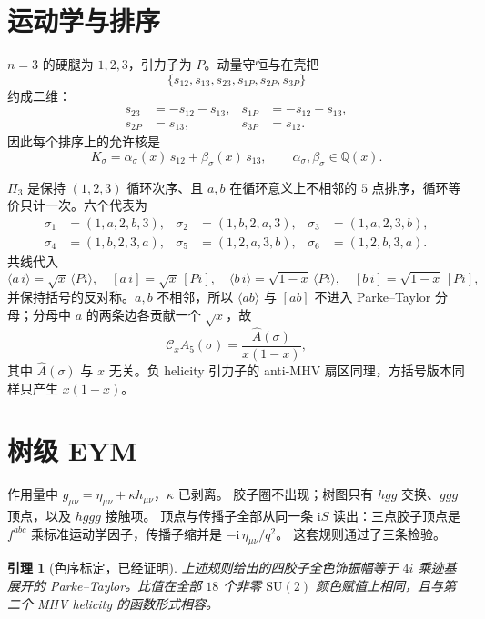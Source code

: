 \documentclass[11pt]{ctexart}
\numberwithin{equation}{section}
\newtheorem{lemma}[theorem]{引理}
\theoremstyle{definition}
\theoremstyle{remark}
\newcommand{\ang}[1]{\langle #1\rangle}
\newcommand{\sq}[1]{[#1]}
\newcommand{\cA}{\mathcal C_x}
\begin{document}
\section{运动学与排序}
$n=3$ 的硬腿为 $1,2,3$，引力子为 $P$。动量守恒与在壳把
\[
\{s_{12},s_{13},s_{23},s_{1P},s_{2P},s_{3P}\}
\]
约成二维：
\begin{equation}
\begin{aligned}
s_{23}&=-s_{12}-s_{13},&
s_{1P}&=-s_{12}-s_{13},\\
s_{2P}&=s_{13},&
s_{3P}&=s_{12}.
\end{aligned}
\label{eq:mandelstam}
\end{equation}
因此每个排序上的允许核是
\[
K_\sigma=\alpha_\sigma(x)\,s_{12}+\beta_\sigma(x)\,s_{13},
\qquad\alpha_\sigma,\beta_\sigma\in\mathbb Q(x).
\]

$\Pi_3$ 是保持 $(1,2,3)$ 循环次序、且 $a,b$ 在循环意义上不相邻的 $5$ 点排序，循环等价只计一次。六个代表为
\begin{align*}
\sigma_1&=(1,a,2,b,3),&
\sigma_2&=(1,b,2,a,3),&
\sigma_3&=(1,a,2,3,b),\\
\sigma_4&=(1,b,2,3,a),&
\sigma_5&=(1,2,a,3,b),&
\sigma_6&=(1,2,b,3,a).
\end{align*}
共线代入
\[
\ang{a\,i}=\sqrt x\,\ang{Pi},\quad
\sq{a\,i}=\sqrt x\,\sq{Pi},\quad
\ang{b\,i}=\sqrt{1-x}\,\ang{Pi},\quad
\sq{b\,i}=\sqrt{1-x}\,\sq{Pi},
\]
并保持括号的反对称。$a,b$ 不相邻，所以 $\ang{ab}$ 与 $\sq{ab}$ 不进入 Parke--Taylor 分母；分母中 $a$ 的两条边各贡献一个 $\sqrt x$，故
\[
\cA A_5(\sigma)=\frac{\widehat A(\sigma)}{x(1-x)},
\]
其中 $\widehat A(\sigma)$ 与 $x$ 无关。负 helicity 引力子的 anti-MHV 扇区同理，方括号版本同样只产生 $x(1-x)$。

\section{树级 EYM}
\label{sec:tree}

作用量中 $g_{\mu\nu}=\eta_{\mu\nu}+\kappa h_{\mu\nu}$，$\kappa$ 已剥离。
胶子圈不出现；树图只有 $hgg$ 交换、$ggg$ 顶点，以及 $hggg$ 接触项。
顶点与传播子全部从同一条 $\mathrm iS$ 读出：三点胶子顶点是 $f^{abc}$ 乘标准运动学因子，传播子缩并是 $-\mathrm i\,\eta_{\mu\nu}/q^2$。
这套规则通过了三条检验。

\begin{lemma}[色序标定，已经证明]
\label{lem:pt}
上述规则给出的四胶子全色饰振幅等于 $4i$ 乘迹基展开的 Parke--Taylor。比值在全部 $18$ 个非零 $\mathrm{SU}(2)$ 颜色赋值上相同，且与第二个 MHV helicity 的函数形式相容。
\end{lemma}
\end{document}
